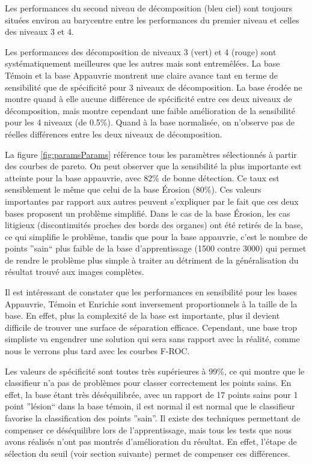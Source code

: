 Les performances du second niveau de décomposition (bleu ciel) sont toujours situées environ au barycentre entre les performances du premier niveau et celles des niveaux 3 et 4.

Les performances des décomposition de niveaux 3 (vert) et 4 (rouge) sont systématiquement meilleures que les autres mais sont entremêlées. La base Témoin et la base Appauvrie montrent une claire avance tant en terme de sensibilité que de spécificité pour 3 niveaux de décomposition. La base érodée ne montre quand à elle aucune différence de spécificité entre ces deux niveaux de décomposition, mais montre cependant une faible amélioration de la sensibilité pour les 4 niveaux (de 0.5\%). Quand à la base normalisée, on n'observe pas de réelles différences entre les deux niveaux de décomposition.

La figure \ref{fig:paramsParams} référence tous les paramètres sélectionnés à partir des courbes de pareto. On peut observer que la sensibilité la plus importante est atteinte pour la base appauvrie, avec 82\% de bonne détection. Ce taux est sensiblement le même que celui de la base Érosion (80\%). Ces valeurs importantes par rapport aux autres peuvent s'expliquer par le fait que ces deux bases proposent un problème simplifié. Dans le cas de la base Érosion, les cas litigieux (discontinuités proches des bords des organes) ont été retirés de la base, ce qui simplifie le problème, tandis que pour la base appauvrie, c'est le nombre de points ''sain`` plus faible de la base d'apprentissage (1500 contre 3000) qui permet de rendre le problème plus simple à traiter au détriment de la généralisation du résultat trouvé aux images complètes.

Il est intéressant de constater que les performances en sensibilité pour les bases Appauvrie, Témoin et Enrichie sont inversement proportionnels à la taille de la base. En effet, plus la complexité de la base est importante, plus il devient difficile de trouver une surface de séparation efficace. Cependant, une base trop simpliste va engendrer une solution qui sera sans rapport avec la réalité, comme nous le verrons plus tard avec les courbes F-ROC.

Les valeurs de spécificité sont toutes très supérieures à 99\%, ce qui montre que le classifieur n'a pas de problèmes pour classer correctement les points sains. En effet, la base étant très déséquilibrée, avec un rapport de 17 points sains pour 1 point ''lésion`` dans la base témoin, il est normal il est normal que le classifieur favorise la classification des points ''sain''. Il existe des techniques permettant de compenser ce déséquilibre lors de l'apprentissage, mais tous les tests que nous avons réalisés n'ont pas montrés d'amélioration du résultat. En effet, l'étape de sélection du seuil (voir section suivante) permet de compenser ces différences.

